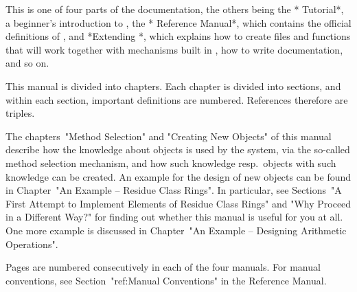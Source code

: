 
This is one of four parts of the {\GAP} documentation,
the others being
the *{\GAP} Tutorial*, a beginner's introduction to {\GAP},
the *{\GAP} Reference Manual*,
which contains the official definitions of {\GAP},
and *Extending {\GAP}*,
which explains how to create files and functions that will work
together with mechanisms built in {\GAP}, how to write documentation,
and so on.

This manual is divided into chapters.
Each chapter is divided into sections,
and within each section, important definitions are numbered.
References therefore are triples.

The chapters~"Method Selection" and "Creating New Objects" of this manual
describe how the knowledge about {\GAP} objects is used by the system,
via the so-called method selection mechanism,
and how such knowledge resp.~objects with such knowledge can be created.
An example for the design of new {\GAP} objects can be found in
Chapter~"An Example -- Residue Class Rings".
In particular,
see Sections~"A First Attempt to Implement Elements of Residue Class Rings"
and "Why Proceed in a Different Way?"
for finding out whether this manual is useful for you at all.
One more example is discussed in
Chapter~"An Example -- Designing Arithmetic Operations".

Pages are numbered consecutively in each of the four manuals.
For manual conventions, see Section~"ref:Manual Conventions"
in the Reference Manual.



